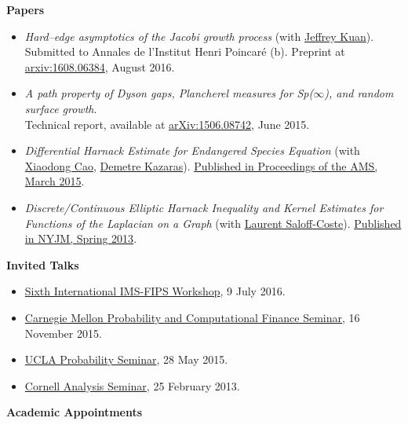 \documentclass[letterpaper,11pt]{article}
\newcommand{\resheading}[1]{{\large {\textbf{#1 \vphantom{p\^{E}}}}}}
\begin{document}
\resheading{Papers}

\begin{itemize}[noitemsep,nolistsep]
	\item \textit{Hard--edge asymptotics of the Jacobi growth process} (with \href{http://www.math.columbia.edu/~kuan/}{Jeffrey Kuan}). \\Submitted to Annales de l'Institut Henri Poincar\'{e} (b). Preprint at \href{https://arxiv.org/abs/1608.06384}{arxiv:1608.06384}, August 2016.
	\item \textit{A path property of Dyson gaps, Plancherel measures for Sp($\infty$), and random surface growth}. \\ Technical report, available at \href{https://arxiv.org/abs/1506.08742}{arXiv:1506.08742}, June 2015.
  \item \textit{Differential Harnack Estimate for Endangered Species Equation} (with \href{http://www.math.cornell.edu/~cao/}{Xiaodong Cao}, \href{http://pages.uoregon.edu/demetre/}{Demetre Kazaras}). \href{http://www.ams.org/journals/proc/2015-143-10/S0002-9939-2015-12576-2/}{Published in Proceedings of the AMS, March 2015}.
  \item \textit{Discrete/Continuous Elliptic Harnack Inequality and Kernel Estimates for Functions of the Laplacian on a Graph} (with \href{http://www.math.cornell.edu/~lsc/lau.html}{Laurent Saloff-Coste}). \href{http://www.emis.de/journals/NYJM/j/2013/19-25.html}{Published in NYJM, Spring 2013}.
\end{itemize}

\resheading{Invited Talks}

\begin{itemize}[noitemsep,nolistsep]
	\item \href{https://www.pims.math.ca/scientific-event/160625-pssmf}{Sixth International IMS-FIPS Workshop}, 9 July 2016. 
	\item \href{http://www.math.cmu.edu/CCF/ccfseminar.php?SeminarSelect=1150}{Carnegie Mellon Probability and Computational Finance Seminar}, 16 November 2015.
	\item \href{https://secure.math.ucla.edu/seminars/display.php?&id=831548}{UCLA Probability Seminar}, 28 May 2015.
	\item \href{http://www.math.cornell.edu/m/node/2088}{Cornell Analysis Seminar}, 25 February 2013.
\end{itemize}

\resheading{Academic Appointments}
\end{document}
